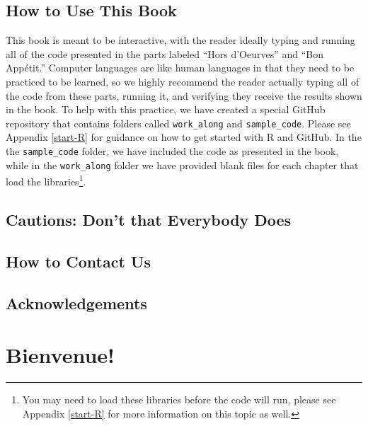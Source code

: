 \documentclass[
]{book}
\begin{document}
\hypertarget{how-to-use-this-book}{%
\section*{How to Use This Book}\label{how-to-use-this-book}}

This book is meant to be interactive, with the reader ideally typing and running all of the code presented in the parts labeled ``Hors d'Oeurves'' and ``Bon Appétit.'' Computer languages are like human languages in that they need to be practiced to be learned, so we highly recommend the reader actually typing all of the code from these parts, running it, and verifying they receive the results shown in the book. To help with this practice, we have created a special GitHub repository that contains folders called \texttt{work\_along} and \texttt{sample\_code}. Please see Appendix \ref{start-R} for guidance on how to get started with R and GitHub. In the the \texttt{sample\_code} folder, we have included the code as presented in the book, while in the \texttt{work\_along} folder we have provided blank files for each chapter that load the libraries\footnote{You may need to load these libraries before the code will run, please see Appendix \ref{start-R} for more information on this topic as well.}.

\hypertarget{cautions-dont-that-everybody-does}{%
\section*{Cautions: Don't that Everybody Does}\label{cautions-dont-that-everybody-does}}

\hypertarget{how-to-contact-us}{%
\section*{How to Contact Us}\label{how-to-contact-us}}

\hypertarget{acknowledgements}{%
\section*{Acknowledgements}\label{acknowledgements}}

\hypertarget{bienvenue}{%
\chapter{Bienvenue!}\label{bienvenue}}
\end{document}
